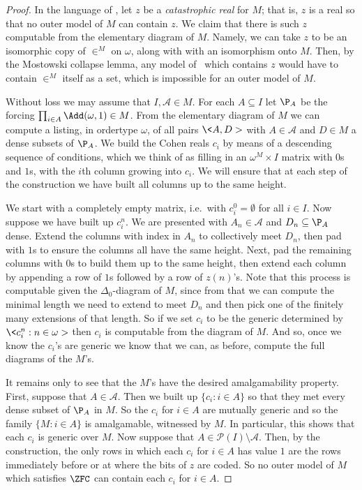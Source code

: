 \documentclass{amsart}
\begin{document}
 \begin{proof}
 In the language of \cite{HHKVW2019}, let $z$ be a \emph{catastrophic real} for $M$; that is, $z$ is a real so that no outer model of $M$ can contain $z$. We claim that there is such $z$ computable from the elementary diagram of $M$. Namely, we can take $z$ to be an isomorphic copy of $\in^M$ on $\omega$, along with with an isomorphism onto $M$. Then, by the Mostowski collapse lemma, any model of \ZF\ which contains $z$ would have to contain $\in^M$ itself as a set, which is impossible for an outer model of $M$.
 
 Without loss we may assume that $I,\mathcal A \in M$. For each $A \subseteq I$ let $\P_A$ be the forcing $\prod_{i \in A} \Add(\omega,1) \in M$.
 From the elementary diagram of $M$ we can compute a listing, in ordertype $\omega$, of all pairs $\<A,D>$ with $A \in \mathcal A$ and $D \in M$ a dense subsets of $\P_A$. We build the Cohen reals $c_i$ by means of a descending sequence of conditions, which we think of as filling in an $\omega^M \times I$ matrix with $0$s and $1$s, with the $i$th column growing into $c_i$. We will ensure that at each step of the construction we have built all columns up to the same height.
 
 We start with a completely empty matrix, i.e.\ with $c^0_i = \emptyset$ for all $i \in I$. Now suppose we have built up $c^n_i$. We are presented with $A_n \in \mathcal A$ and $D_n \subseteq \P_A$ dense. Extend the columns with index in $A_n$ to collectively meet $D_n$, then pad with $1$s to ensure the columns all have the same height. Next, pad the remaining columns with $0$s to build them up to the same height, then extend each column by appending a row of $1$s followed by a row of $z(n)$'s. Note that this process is computable given the $\Delta_0$-diagram of $M$, since from that we can compute the minimal length we need to extend to meet $D_n$ and then pick one of the finitely many extensions of that length. So if we set $c_i$ to be the generic determined by $\<c^n_i : n \in \omega>$ then $c_i$ is computable from the diagram of $M$. And so, once we know the $c_i$'s are generic we know that we can, as before, compute the full diagrams of the $M$'s.
 
 It remains only to see that the $M$'s have the desired amalgamability property. First, suppose that $A \in \mathcal A$. Then we built up $\{ c_i : i \in A \}$ so that they met every dense subset of $\P_A$ in $M$. So the $c_i$ for $i \in A$ are mutually generic and so the family $\{ M : i \in A \}$ is amalgamable, witnessed by $M$. In particular, this shows that each $c_i$ is generic over $M$. Now suppose that $A \in \mathcal P(I) \setminus \mathcal A$. Then, by the construction, the only rows in which each $c_i$ for $i \in A$ has value $1$ are the rows immediately before or at where the bits of $z$ are coded. So no outer model of $M$ which satisfies $\ZFC$ can contain each $c_i$ for $i \in A$.
 \end{proof}
 
\end{document}
